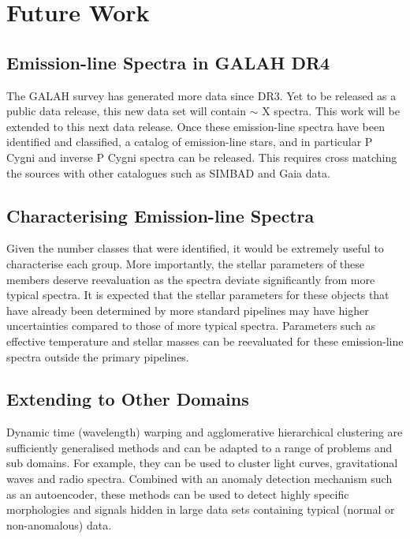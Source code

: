 \section{Future Work}

\subsection{Emission-line Spectra in GALAH DR4}

The GALAH survey has generated more data since DR3. Yet to be released as a public data release, this new data set will contain $\sim$ X spectra. This work will be extended to this next data release. Once these emission-line spectra have been identified and classified, a catalog of emission-line stars, and in particular P Cygni and inverse P Cygni spectra can be released. This requires cross matching the sources with other catalogues such as SIMBAD and Gaia data.

\subsection{Characterising Emission-line Spectra}

Given the number classes that were identified, it would be extremely useful to characterise each group. More importantly, the stellar parameters of these members deserve reevaluation as the spectra deviate significantly from more typical spectra. It is expected that the stellar parameters for these objects that have already been determined by more standard pipelines may have higher uncertainties compared to those of more typical spectra. Parameters such as effective temperature and stellar masses can be reevaluated for these emission-line spectra outside the primary pipelines.

\subsection{Extending to Other Domains}

Dynamic time (wavelength) warping and agglomerative hierarchical clustering are sufficiently generalised methods and can be adapted to a range of problems and sub domains. For example, they can be used to cluster light curves, gravitational waves and radio spectra. Combined with an anomaly detection mechanism such as an autoencoder, these methods can be used to detect highly specific morphologies and signals hidden in large data sets containing typical (normal or non-anomalous) data. 

